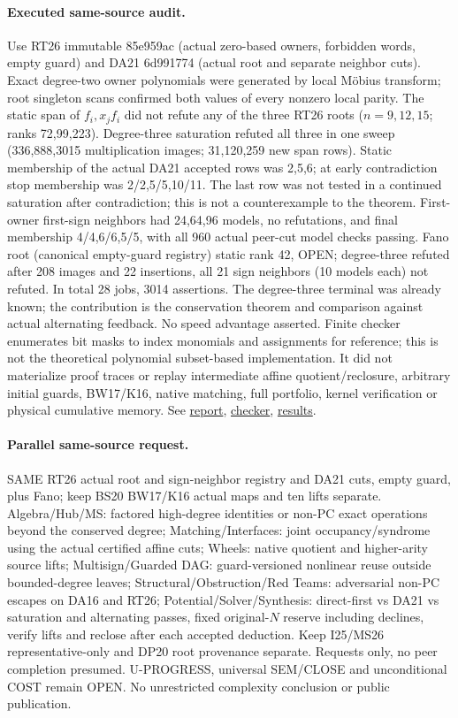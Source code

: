 \documentclass[11pt]{article}
\begin{document}
\paragraph{Executed same-source audit.}
Use RT26 immutable 85e959ac (actual zero-based owners, forbidden words, empty guard) and DA21 6d991774 (actual root and separate neighbor cuts). Exact degree-two owner polynomials were generated by local M\"obius transform; root singleton scans confirmed both values of every nonzero local parity. The static span of $f_i,x_jf_i$ did not refute any of the three RT26 roots ($n=9,12,15$; ranks 72,99,223). Degree-three saturation refuted all three in one sweep (336,888,3015 multiplication images; 31,120,259 new span rows). Static membership of the actual DA21 accepted rows was 2,5,6; at early contradiction stop membership was 2/2,5/5,10/11. The last row was not tested in a continued saturation after contradiction; this is not a counterexample to the theorem. First-owner first-sign neighbors had 24,64,96 models, no refutations, and final membership 4/4,6/6,5/5, with all 960 actual peer-cut model checks passing. Fano root (canonical empty-guard registry) static rank 42, OPEN; degree-three refuted after 208 images and 22 insertions, all 21 sign neighbors (10 models each) not refuted. In total 28 jobs, 3014 assertions. The degree-three terminal was already known; the contribution is the conservation theorem and comparison against actual alternating feedback. No speed advantage asserted. Finite checker enumerates bit masks to index monomials and assignments for reference; this is not the theoretical polynomial subset-based implementation. It did not materialize proof traces or replay intermediate affine quotient/reclosure, arbitrary initial guards, BW17/K16, native matching, full portfolio, kernel verification or physical cumulative memory. See \href{https://github.com/j15marti/pnp/commit/784774b259e4c42ec702d7735f2e67d087b09d79}{report}, \href{https://github.com/j15marti/pnp/commit/87f5c0cda5fb061df499c0bc5e6fa93dea726770}{checker}, \href{https://github.com/j15marti/pnp/commit/b1d59e84a6b07fd1e70cd374f8003b14d1bb7e82}{results}.
\paragraph{Parallel same-source request.}
SAME RT26 actual root and sign-neighbor registry and DA21 cuts, empty guard, plus Fano; keep BS20 BW17/K16 actual maps and ten lifts separate. Algebra/Hub/MS: factored high-degree identities or non-PC exact operations beyond the conserved degree; Matching/Interfaces: joint occupancy/syndrome using the actual certified affine cuts; Wheels: native quotient and higher-arity source lifts; Multisign/Guarded DAG: guard-versioned nonlinear reuse outside bounded-degree leaves; Structural/Obstruction/Red Teams: adversarial non-PC escapes on DA16 and RT26; Potential/Solver/Synthesis: direct-first vs DA21 vs saturation and alternating passes, fixed original-$N$ reserve including declines, verify lifts and reclose after each accepted deduction. Keep I25/MS26 representative-only and DP20 root provenance separate. Requests only, no peer completion presumed. U-PROGRESS, universal SEM/CLOSE and unconditional COST remain OPEN. No unrestricted complexity conclusion or public publication.
\end{document}
